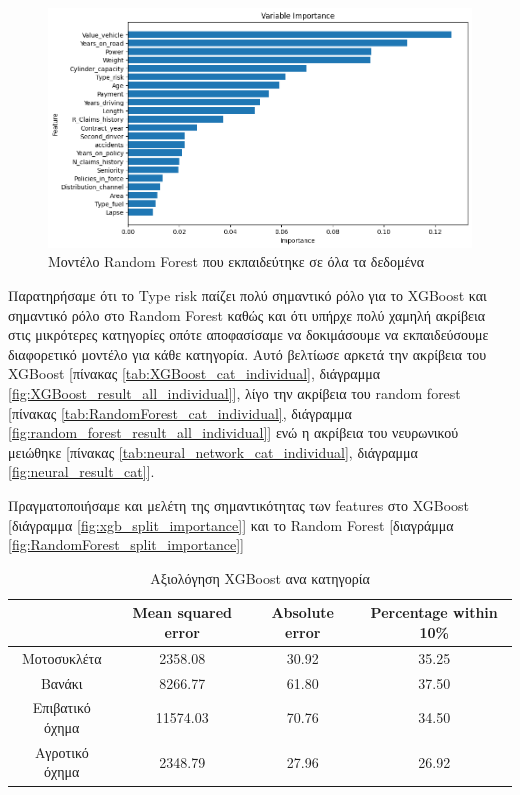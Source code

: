 \documentclass{llncs}
\begin{document}
\begin{figure}
    \begin{center}
        \includegraphics[width=1\textwidth]{images/feature_importance_combined_random_forest.png}
    \end{center}
    \caption{Μοντέλο Random Forest που εκπαιδεύτηκε σε όλα τα δεδομένα}  
    \label{fig:random_forest_all_feature_importance}  
\end{figure}

Παρατηρήσαμε ότι το Type risk παίζει πολύ σημαντικό ρόλο για το XGBoost και σημαντικό ρόλο στο
Random Forest καθώς και ότι υπήρχε πολύ χαμηλή ακρίβεια στις μικρότερες κατηγορίες οπότε
αποφασίσαμε να δοκιμάσουμε να εκπαιδεύσουμε διαφορετικό μοντέλο για κάθε κατηγορία. Αυτό βελτίωσε αρκετά την ακρίβεια 
του XGBoost [πίνακας \ref{tab:XGBoost_cat_individual}, διάγραμμα \ref{fig:XGBoost_result_all_individual}], 
λίγο την ακρίβεια του random forest [πίνακας \ref{tab:RandomForest_cat_individual}, διάγραμμα \ref{fig:random_forest_result_all_individual}] 
ενώ η ακρίβεια του νευρωνικού μειώθηκε [πίνακας \ref{tab:neural_network_cat_individual}, διάγραμμα \ref{fig:neural_result_cat}].

Πραγματοποιήσαμε και μελέτη της σημαντικότητας των features 
στο XGBoost [διάγραμμα \ref{fig:xgb_split_importance}] και 
το Random Forest [διαγράμμα \ref{fig:RandomForest_split_importance}]

\begin{table}
    \centering
    \begin{tabular}{|c|c|c|c|} %
        \hline
         &Mean squared error & Absolute error & Percentage within 10\% \\ %
        \hline
        Μοτοσυκλέτα & 2358.08 & 30.92 & 35.25 \\
        Βανάκι & 8266.77 & 61.80 & 37.50 \\
        Επιβατικό όχημα & 11574.03 & 70.76 & 34.50 \\
        Αγροτικό όχημα & 2348.79 & 27.96 & 26.92 \\
        \hline
    \end{tabular}
    \caption{Αξιολόγηση XGBoost ανα κατηγορία}
    \label{tab:XGBoost_cat_together}
\end{table}
\end{document}

